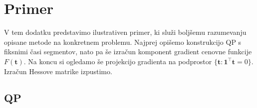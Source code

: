 \documentclass[mat2, tisk]{fmfdelo}
\newcommand{\tvec}{\mathbf{t}}
\begin{document}









\appendix

\section{Primer}
\label{app:example}
V tem dodatku predstavimo ilustrativen primer, ki služi boljšemu razumevanju opisane metode na konkretnem problemu. Najprej opišemo konstrukcijo QP s fiksnimi časi segmentov, nato pa še izračun komponent gradient cenovne funkcije $F(\tvec)$. Na koncu si ogledamo še projekcijo gradienta na podprostor $\lbrace \tvec : \mathbf{1}^\top \tvec = 0 \rbrace$. Izračun Hessove matrike izpustimo.

\subsection{QP}
\end{document}

